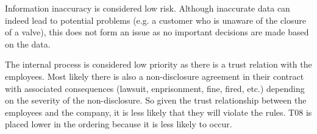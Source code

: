 \npar Information inaccuracy is considered low risk. Although inaccurate data
can indeed lead to potential problems (e.g. a customer who is unaware of the
closure of a valve), this does not form an issue as no important decisions are
made based on the data.

\npar The internal process is considered low priority as there is a trust
relation with the employees. Most likely there is also a non-disclosure
agreement in their contract with associated consequences (lawsuit,
enprisonment, fine, fired, etc.) depending on the severity of the
non-disclosure. So given the trust relationship between the employees and the
company, it is less likely that they will violate the rules. T08 is placed lower
in the ordering because it is less likely to occur. 
